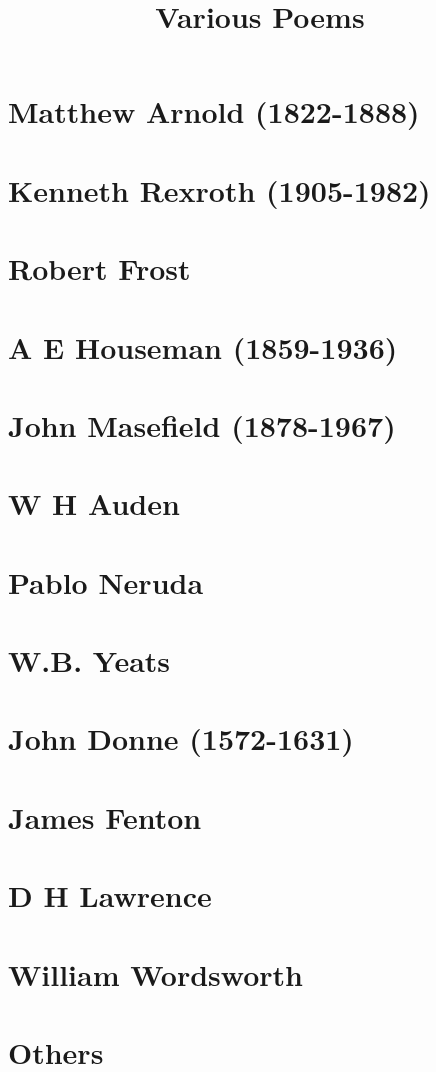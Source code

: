 \documentclass[a4paper,draft]{article}
\title{Various Poems}
\author{}
\date{}
\begin{document}
\maketitle

\section*{Matthew Arnold (1822-1888)} 


\section*{Kenneth Rexroth (1905-1982)} 


\section*{Robert Frost}


\section*{A E Houseman (1859-1936)}


\section*{John Masefield (1878-1967)}


\section*{W H Auden}


\section*{Pablo Neruda}


\section*{W.B. Yeats}


\section*{John Donne (1572-1631)}


\section*{James Fenton}


\section*{D H Lawrence}


\section*{William Wordsworth}



\section*{Others}

\end{document}

